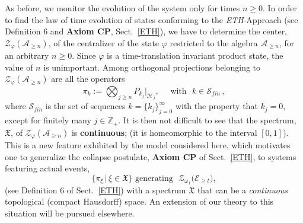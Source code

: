 \documentclass[12pt]{article}
\begin{document}
{As before, we monitor the evolution of the system only for times $n\geq 0$. In order to find the law of time evolution of
states conforming to the \textit{ETH}-Approach (see Definition 6 and {\bf{Axiom CP}}, Sect.~\ref{ETH}), we have to
determine the center, $\mathcal{Z}_{\varphi}(\mathcal{A}_{\geq n})$, of the centralizer of the state $\varphi$
restricted to the algebra $\mathcal{A}_{\geq n}$, for an arbitrary $n\geq 0$. Since $\varphi$ is a time-translation
invariant product state, the value of $n$ is unimportant. Among orthogonal projections belonging to
$\mathcal{Z}_{\varphi}(\mathcal{A}_{\geq n})$ are all the operators
\begin{equation}\label{central proj}
\pi_{{k}} := \bigotimes_{j\geq n} P_{k_j}\vert_{\mathcal{H}_j}, \quad \text{  with  }\,\,{k}\in \mathcal{S}_{fin}\,,
\end{equation}
where $\mathcal{S}_{fin}$ is the set of sequences ${k}=\big\{k_j\big\}_{j=0}^{\infty}$ with the property that
$k_j =0$, except for finitely many $j\in \mathbb{Z}_{+}$.
It is then not difficult to see that the spectrum, $\mathfrak{X}$, of $\mathcal{Z}_{\varphi}(\mathcal{A}_{\geq n})$
is {\bf{continuous}}; (it is homeomorphic to the interval $[0,1]$). This is a new feature exhibited by the model considered
here, which motivates one to generalize the collapse postulate, {\bf{Axiom CP}} of Sect.~\ref{ETH}, to systems
featuring actual events,
$$\big\{ \pi_{\xi}\,\vert \,\xi \in \mathfrak{X} \big\} \,\,\text{generating   }\,\, \mathcal{Z}_{\omega_{\,t}}\big(\mathcal{E}_{\geq t}\big),$$
(see Definition 6 of Sect.~\ref{ETH}) with a spectrum $\mathfrak{X}$ that can be a \textit{continuous} topological (compact Hausdorff) space. An extension of our theory to this situation will be pursued elsewhere.

}
\end{document}
